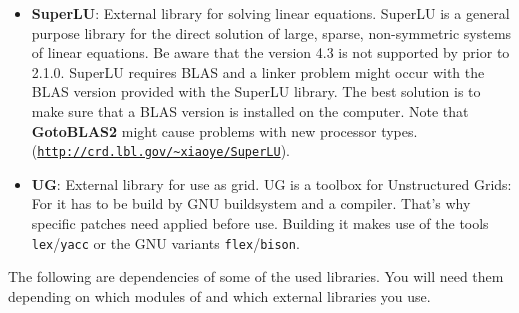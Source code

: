 \begin{itemize}
\item \textbf{SuperLU}: External library for solving linear equations. SuperLU is a general purpose library for the direct solution of large, sparse, non-symmetric systems of linear equations. Be aware that the version 4.3 is not supported by \Dune prior to 2.1.0. SuperLU requires BLAS and a linker problem might occur with the BLAS version provided with the SuperLU library. The best solution is to make sure that a BLAS version is installed on the computer. Note that \textbf{GotoBLAS2} might cause problems with new processor types.\\ (\texttt{\url{http://crd.lbl.gov/~xiaoye/SuperLU}}).

\item \textbf{UG}: External library for use as grid. UG is a toolbox for Unstructured Grids: For \Dumux it has to be build by GNU buildsystem and a \Cplusplus compiler. That's why \Dune specific patches need applied before use. Building it makes use of the tools \texttt{lex}/\texttt{yacc} or the GNU variants \texttt{flex}/\texttt{bison}. 

\end{itemize}

The following are dependencies of some of the used libraries. You will need them depending on which modules of \Dune and which external libraries you use.

